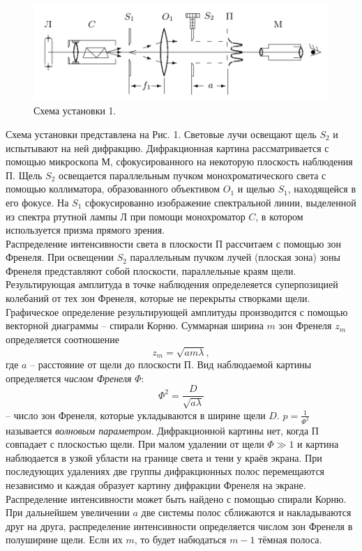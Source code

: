 \documentclass[a4paper, 12pt]{article}%
\begin{document}
	 
	 \begin{figure}[h]
	 	\includegraphics[scale=0.7]{0.png}
	 	\centering
	 	\caption{Схема установки 1.}
	 \end{figure}
	 Схема установки представлена на Рис. 1. Световые лучи освещают щель $S_2$ и испытывают на ней дифракцию. Дифракционная картина рассматривается с помощью микроскопа М, сфокусированного на некоторую плоскость наблюдения П. Щель $S_2$ освещается параллельным пучком монохроматического света с помощью коллиматора, образованного объективом $O_1$ и щелью $S_1$, находящейся в его фокусе. На $S_1$ сфокусированно изображение спектральной линии, выделенной из спектра ртутной лампы Л при помощи монохроматор $C$, в котором используется призма прямого зрения. \\
	 Распределение интенсивности света в плоскости П рассчитаем с помощью зон Френеля. При освещении $S_2$ параллельным пучком лучей (плоская зона) зоны Френеля представляют собой плоскости, параллельные краям щели. Результирующая амплитуда в точке наблюдения определеяется суперпозицией колебаний от тех зон Френеля, которые не перекрыты створками щели. Графическое определение результирующей амплитуды производится с помощью векторной диаграммы -- спирали Корню. Суммарная ширина $m$ зон Френеля $z_m$ определяется соотношение
	 \begin{equation}
	 	z_m = \sqrt{am\lambda},
	 \end{equation}
	 где $a$ -- расстояние от щели до плоскости П. Вид наблюдаемой картины определяется \textit{числом Френеля} $\Phi$:
	 $$
	 \Phi^2 = \dfrac{D}{\sqrt{a\lambda}}
	 $$
	 -- число зон Френеля, которые укладываются в ширине щели $D$. $p = \frac{1}{\Phi^2}$ называется \textit{волновым параметром}. Дифракционной картины нет, когда П совпадает с плоскостью щели. При малом удалении от щели $\Phi \gg 1$ и картина наблюдается в узкой убласти на границе света и тени у краёв экрана. При последующих удалениях две группы дифракционных полос перемещаются независимо и каждая образует картину дифракции Френеля на экране. Распределение интенсивности может быть найдено с помощью спирали Корню. При дальнейшем увеличении $a$ две системы полос сближаются и накладываются друг на друга, распределение интенсивности определяется числом зон Френеля в полуширине щели. Если их $m$, то будет набюдаться $m-1$ тёмная полоса.\\
	 
\end{document}

